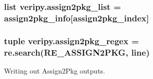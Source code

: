 \hypertarget{namespaceveripy_a069ecdd68f4a51cf7151b361b4159f4a}{
\subsubsection[{assign2pkg\-\_\-list}]{\setlength{\rightskip}{0pt plus 5cm}list veripy.\-assign2pkg\-\_\-list = {\bf assign2pkg\-\_\-info}\mbox{[}{\bf assign2pkg\-\_\-index}\mbox{]}}}\label{namespaceveripy_a069ecdd68f4a51cf7151b361b4159f4a}
\hypertarget{namespaceveripy_a7acecc4bebb723a0ef94b24f5130faac}{
\subsubsection[{assign2pkg\-\_\-regex}]{\setlength{\rightskip}{0pt plus 5cm}tuple veripy.\-assign2pkg\-\_\-regex = re.\-search(R\-E\-\_\-\-A\-S\-S\-I\-G\-N2\-P\-K\-G, {\bf line})}}\label{namespaceveripy_a7acecc4bebb723a0ef94b24f5130faac}


Writing out Assign2\-Pkg outputs. 

